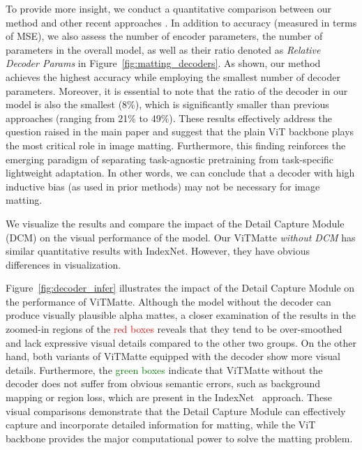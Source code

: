\documentclass[10pt,twocolumn,letterpaper]{article}
\newcommand{\thename}{ViTMatte}
\begin{document}
To provide more insight, we conduct a quantitative comparison between our method and other recent approaches \cite{matteformer, fba, sim, MGM, GCAMatting}. In addition to accuracy (measured in terms of MSE), we also assess the number of encoder parameters, the number of parameters in the overall model, as well as their ratio denoted as \emph{Relative Decoder Params} in Figure~\ref{fig:matting_decoders}. As shown, our method achieves the highest accuracy while employing the smallest number of decoder parameters. Moreover, it is essential to note that the ratio of the decoder in our model is also the smallest (8\%), which is significantly smaller than previous approaches (ranging from 21\% to 49\%). These results effectively address the question raised in the main paper and suggest that the plain ViT backbone plays the most critical role in image matting. Furthermore, this finding reinforces the emerging paradigm of separating task-agnostic pretraining from task-specific lightweight adaptation. In other words, we can conclude that a decoder with high inductive bias (as used in prior methods) may not be necessary for image matting.

We visualize the results and compare the impact of the Detail Capture Module (DCM) on the visual performance of the model. Our \thename{} \emph{without DCM}  has similar quantitative results with IndexNet\cite{indexnet}. However, they have obvious differences in visualization.

Figure~\ref{fig:decoder_infer} illustrates the impact of the Detail Capture Module on the performance of \thename{}. Although the model without the decoder can produce visually plausible alpha mattes, a closer examination of the results in the zoomed-in regions of the \textcolor{red}{red boxes} reveals that they tend to be over-smoothed and lack expressive visual details compared to the other two groups. On the other hand, both variants of \thename{} equipped with the decoder show more visual details. Furthermore, the \textcolor{green}{green boxes} indicate that \thename{} without the decoder does not suffer from obvious semantic errors, such as background mapping or region loss, which are present in the IndexNet~\cite{indexnet} approach. These visual comparisons demonstrate that the Detail Capture Module can effectively capture and incorporate detailed information for matting, while the ViT backbone provides the major computational power to solve the matting problem.
\end{document}
